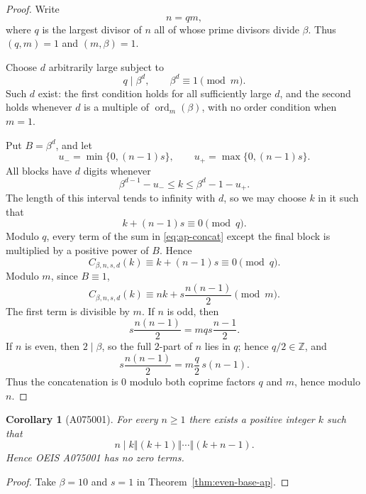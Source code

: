 \documentclass[11pt]{amsart}
\newtheorem{corollary}[theorem]{Corollary}
\theoremstyle{remark}
\newcommand{\concat}{\mathbin{\Vert}}
\newcommand{\ord}{\operatorname{ord}}
\begin{document}
\begin{proof}
Write
\begin{equation}\label{eq:ap-factorization}
n=qm,
\end{equation}
where \(q\) is the largest divisor of \(n\) all of whose prime divisors divide \(\beta\).  Thus
\((q,m)=1\) and \((m,\beta)=1\).

Choose \(d\) arbitrarily large subject to
\[
q\mid\beta^d,
\qquad
\beta^d\equiv1\pmod m.
\]
Such \(d\) exist: the first condition holds for all sufficiently large \(d\), and the
second holds whenever \(d\) is a multiple of \(\ord_m(\beta)\), with no order condition
when \(m=1\).

Put \(B=\beta^d\), and let
\[
u_- =\min\{0,(n-1)s\},
\qquad
u_+ =\max\{0,(n-1)s\}.
\]
All blocks have \(d\) digits whenever
\begin{equation}\label{eq:ap-window}
\beta^{d-1}-u_-
\le k\le
\beta^d-1-u_+.
\end{equation}
The length of this interval tends to infinity with \(d\), so we may choose \(k\) in it such
that
\[
k+(n-1)s\equiv0\pmod q.
\]
Modulo \(q\), every term of the sum in \eqref{eq:ap-concat} except the final block is
multiplied by a positive power of \(B\).  Hence
\begin{equation}\label{eq:ap-smooth}
C_{\beta,n,s,d}(k)\equiv k+(n-1)s\equiv0\pmod q.
\end{equation}
Modulo \(m\), since \(B\equiv1\),
\begin{equation}\label{eq:ap-coprime}
C_{\beta,n,s,d}(k)
 \equiv nk+s\frac{n(n-1)}2\pmod m.
\end{equation}
The first term is divisible by \(m\).  If \(n\) is odd, then
\[
s\frac{n(n-1)}2=mqs\frac{n-1}{2}.
\]
If \(n\) is even, then \(2\mid\beta\), so the full \(2\)-part of \(n\) lies in \(q\);
hence \(q/2\in\mathbb Z\), and
\[
s\frac{n(n-1)}2=m\frac q2\,s(n-1).
\]
Thus the concatenation is \(0\) modulo both coprime factors \(q\) and \(m\), hence modulo
\(n\).
\end{proof}

\begin{corollary}[A075001]\label{cor:A075001}
For every \(n\ge1\) there exists a positive integer \(k\) such that
\[
n\mid k\concat(k+1)\concat\cdots\concat(k+n-1).
\]
Hence OEIS A075001 has no zero terms.
\end{corollary}

\begin{proof}
Take \(\beta=10\) and \(s=1\) in Theorem~\ref{thm:even-base-ap}.
\end{proof}
\end{document}
